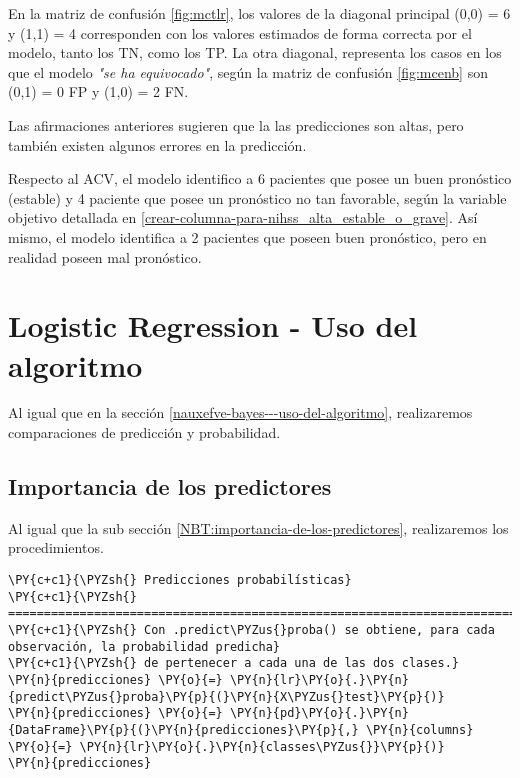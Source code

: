 	En la matriz de confusión \ref{fig:mctlr}, los valores de la diagonal principal (0,0) = 6 y (1,1) = 4 corresponden con los valores estimados de forma correcta por el modelo, tanto los TN, como los TP. La otra diagonal, representa los casos en los que el modelo \textit{"se ha equivocado"}, según la matriz de confusión \ref{fig:mcenb} son (0,1) = 0 FP y (1,0) = 2 FN.
\par Las afirmaciones anteriores sugieren que la las predicciones son altas, pero también existen algunos errores en la predicción.
\par Respecto al ACV, el modelo identifico a 6 pacientes que posee un buen pronóstico (estable) y 4 paciente que posee un pronóstico no tan favorable, según la variable objetivo detallada en \ref{crear-columna-para-nihss_alta_estable_o_grave}. Así mismo, el modelo identifica a 2 pacientes que poseen buen pronóstico, pero en realidad poseen mal pronóstico.\\
    

    \hypertarget{logistic-regression---uso-del-algoritmo}{%
\section{Logistic Regression - Uso del algoritmo}\label{logistic-regression---uso-del-algoritmo}}

	Al igual que en la sección \ref{nauxefve-bayes---uso-del-algoritmo}, realizaremos comparaciones de predicción y probabilidad.

    \hypertarget{importancia-de-los-predictores}{%
\subsection{Importancia de los predictores}\label{importancia-de-los-predictores}}

 Al igual que la sub sección \ref{NBT:importancia-de-los-predictores}, realizaremos los procedimientos.

    \begin{tcolorbox}[breakable, size=fbox, boxrule=1pt, pad at break*=1mm,colback=cellbackground, colframe=cellborder]
\begin{Verbatim}[commandchars=\\\{\}]
\PY{c+c1}{\PYZsh{} Predicciones probabilísticas}
\PY{c+c1}{\PYZsh{} ==============================================================================}
\PY{c+c1}{\PYZsh{} Con .predict\PYZus{}proba() se obtiene, para cada observación, la probabilidad predicha}
\PY{c+c1}{\PYZsh{} de pertenecer a cada una de las dos clases.}
\PY{n}{predicciones} \PY{o}{=} \PY{n}{lr}\PY{o}{.}\PY{n}{predict\PYZus{}proba}\PY{p}{(}\PY{n}{X\PYZus{}test}\PY{p}{)}
\PY{n}{predicciones} \PY{o}{=} \PY{n}{pd}\PY{o}{.}\PY{n}{DataFrame}\PY{p}{(}\PY{n}{predicciones}\PY{p}{,} \PY{n}{columns} \PY{o}{=} \PY{n}{lr}\PY{o}{.}\PY{n}{classes\PYZus{}}\PY{p}{)}
\PY{n}{predicciones}
\end{Verbatim}
\end{tcolorbox}

